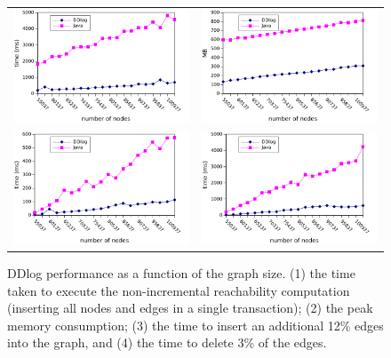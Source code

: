 \begin{figure}
  \begin{center}
    \begin{tabular}{ll}
      \includegraphics[width=.5\columnwidth]{non-incremental.pdf} &
      \includegraphics[width=.5\columnwidth]{memory.pdf} \\
      \includegraphics[width=.5\columnwidth]{insertion.pdf} &
      \includegraphics[width=.5\columnwidth]{deletion.pdf} \\
    \end{tabular}
  \end{center}
    \caption{DDlog performance as a function of the graph size.  (1)
      the time taken to execute the non-incremental reachability
      computation (inserting all nodes and edges in a single
      transaction); (2) the peak memory consumption; (3) the time to
      insert an additional 12\% edges into the graph, and (4) the time
      to delete 3\% of the edges.\label{fig:performance}}
\end{figure}
